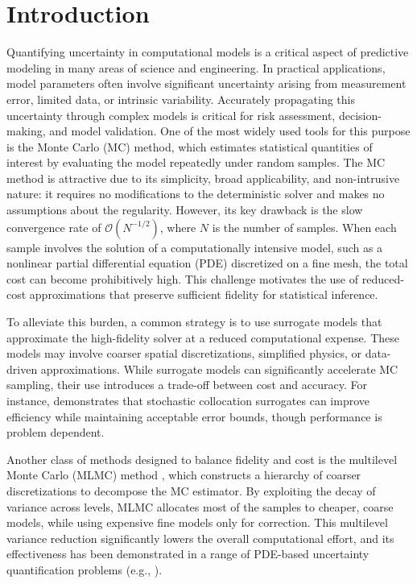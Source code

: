 \section{Introduction}\label{sec:intro}
Quantifying uncertainty in computational models is a critical aspect of predictive modeling in many areas of science and engineering. In practical applications, model parameters often involve significant uncertainty arising from measurement error, limited data, or intrinsic variability. Accurately propagating this uncertainty through complex models is critical for risk assessment, decision-making, and model validation. One of the most widely used tools for this purpose is the Monte Carlo (MC) method, which estimates statistical quantities of interest by evaluating the model repeatedly under random samples. The MC method is attractive due to its simplicity, broad applicability, and non-intrusive nature: it requires no modifications to the deterministic solver and makes no assumptions about the regularity. However, its key drawback is the slow convergence rate of $\mathcal{O}(N^{-1/2})$, where $N$ is the number of samples. When each sample involves the solution of a computationally intensive model, such as a nonlinear partial differential equation (PDE) discretized on a fine mesh, the total cost can become prohibitively high. This challenge motivates the use of reduced-cost approximations that preserve sufficient fidelity for statistical inference.

To alleviate this burden, a common strategy is to use surrogate models that approximate the high-fidelity solver at a reduced computational expense. These models may involve coarser spatial discretizations, simplified physics, or data-driven approximations. While surrogate models can significantly accelerate MC sampling, their use introduces a trade-off between cost and accuracy. For instance, \cite{ElLiSa:2022} demonstrates that stochastic collocation surrogates can improve efficiency while maintaining acceptable error bounds, though performance is problem dependent.

Another class of methods designed to balance fidelity and cost is the multilevel Monte Carlo (MLMC) method \cite{BaScZo:2011,Gi:2008,Gi:2015}, which constructs a hierarchy of coarser discretizations to decompose the MC estimator. By exploiting the decay of variance across levels, MLMC allocates most of the samples to cheaper, coarse models, while using expensive fine models only for correction. This multilevel variance reduction significantly lowers the overall computational effort, and its effectiveness has been demonstrated in a range of PDE-based uncertainty quantification problems (e.g., \cite{ElLiSa:2023}).


